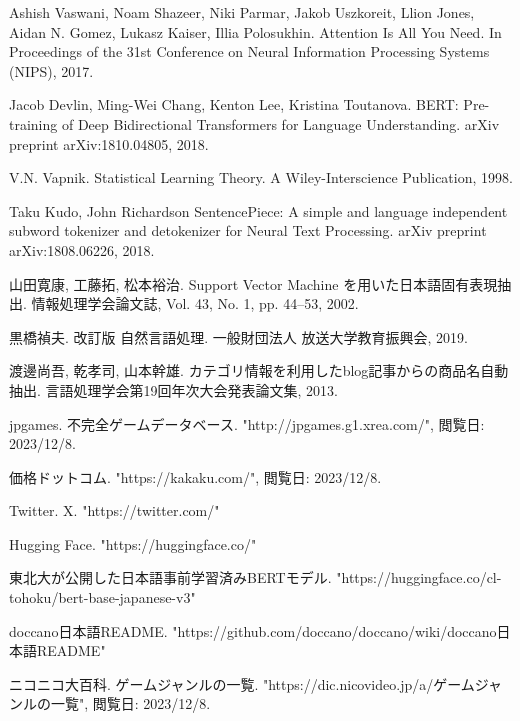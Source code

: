 \documentclass[a4paper,11pt]{jreport}
\begin{document}
\begin{thebibliography}{5000}
Ashish Vaswani, Noam Shazeer, Niki Parmar, Jakob Uszkoreit, Llion Jones, Aidan N. Gomez, Lukasz Kaiser, Illia Polosukhin.
\newblock Attention Is All You Need.
\newblock  In Proceedings of the 31st Conference on Neural Information Processing Systems (NIPS), 2017.

Jacob Devlin, Ming-Wei Chang, Kenton Lee, Kristina Toutanova.
\newblock BERT: Pre-training of Deep Bidirectional Transformers for Language Understanding.
\newblock arXiv preprint arXiv:1810.04805, 2018.

V.N. Vapnik. 
\newblock Statistical Learning Theory. 
\newblock A Wiley-Interscience Publication, 1998.

Taku Kudo, John Richardson
\newblock SentencePiece: A simple and language independent subword tokenizer and detokenizer for Neural Text Processing.
\newblock arXiv preprint arXiv:1808.06226, 2018.

山田寛康, 工藤拓, 松本裕治.
\newblock Support Vector Machine を用いた日本語固有表現抽出. 
\newblock 情報処理学会論文誌, Vol. 43, No. 1, pp. 44–53, 2002.

黒橋禎夫. 
\newblock 改訂版 自然言語処理. 
\newblock 一般財団法人 放送大学教育振興会, 2019. 

渡邊尚吾, 乾孝司, 山本幹雄. 
\newblock カテゴリ情報を利用したblog記事からの商品名自動抽出.
\newblock 言語処理学会第19回年次大会発表論文集, 2013.

jpgames.
\newblock 不完全ゲームデータベース.
\newblock "http://jpgames.g1.xrea.com/", 閲覧日: 2023/12/8.

価格ドットコム.
\newblock "https://kakaku.com/", 閲覧日: 2023/12/8.

Twitter. X.
\newblock "https://twitter.com/"

Hugging Face.
\newblock "https://huggingface.co/"

東北大が公開した日本語事前学習済みBERTモデル.
\newblock "https://huggingface.co/cl-tohoku/bert-base-japanese-v3"

doccano日本語README.
\newblock "https://github.com/doccano/doccano/wiki/doccano日本語README"

ニコニコ大百科.
\newblock ゲームジャンルの一覧.
\newblock "https://dic.nicovideo.jp/a/ゲームジャンルの一覧", 閲覧日: 2023/12/8.

\end{thebibliography}
\end{document}
